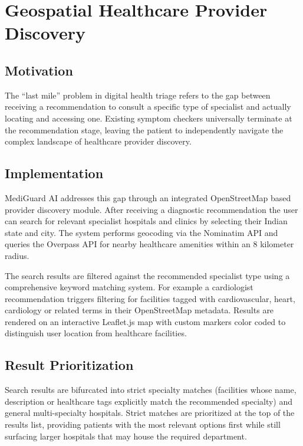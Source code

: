 \documentclass[conference]{IEEEtran}
\begin{document}
\section{Geospatial Healthcare Provider Discovery}

\subsection{Motivation}

The ``last mile'' problem in digital health triage refers to the gap between receiving a recommendation to consult a specific type of specialist and actually locating and accessing one. Existing symptom checkers universally terminate at the recommendation stage, leaving the patient to independently navigate the complex landscape of healthcare provider discovery.

\subsection{Implementation}

MediGuard AI addresses this gap through an integrated OpenStreetMap based provider discovery module. After receiving a diagnostic recommendation the user can search for relevant specialist hospitals and clinics by selecting their Indian state and city. The system performs geocoding via the Nominatim API and queries the Overpass API for nearby healthcare amenities within an 8 kilometer radius.

The search results are filtered against the recommended specialist type using a comprehensive keyword matching system. For example a cardiologist recommendation triggers filtering for facilities tagged with cardiovascular, heart, cardiology or related terms in their OpenStreetMap metadata. Results are rendered on an interactive Leaflet.js map with custom markers color coded to distinguish user location from healthcare facilities.

\subsection{Result Prioritization}

Search results are bifurcated into strict specialty matches (facilities whose name, description or healthcare tags explicitly match the recommended specialty) and general multi-specialty hospitals. Strict matches are prioritized at the top of the results list, providing patients with the most relevant options first while still surfacing larger hospitals that may house the required department.
\end{document}
